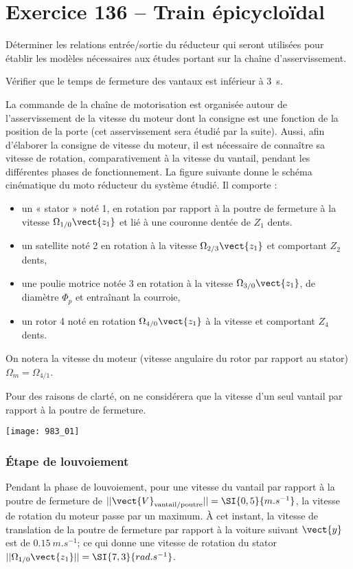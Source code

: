 \section*{Exercice 136 -- Train épicycloïdal}
\setcounter{exo}{0}


\begin{obj}
Déterminer les relations entrée/sortie du réducteur qui seront utilisées pour établir les modèles nécessaires aux études portant sur la chaîne d’asservissement.

Vérifier que le temps de fermeture des vantaux est inférieur à \SI{3}{s}.
\end{obj}

La commande de la chaîne de motorisation est organisée autour de l’asservissement
de la vitesse du moteur dont la consigne est une fonction de la position de
la porte (cet asservissement sera étudié par la suite). Aussi, afin d’élaborer la
consigne de vitesse du moteur, il est nécessaire de connaître sa vitesse de rotation,
comparativement à la vitesse du vantail, pendant les différentes phases de
fonctionnement.
La figure suivante donne le schéma cinématique du moto réducteur du système étudié.
Il comporte :
\begin{itemize}
\item un « stator » noté 1, en rotation par rapport à la poutre de fermeture à la
vitesse $\Omega_{1/0}\vect{z_1}$ et lié à une couronne dentée de $Z_1$ dents.
\item un satellite noté 2 en rotation à la vitesse $\Omega_{2/3}\vect{z_1}$ et comportant $Z_2$ dents,
\item une poulie motrice notée 3 en rotation à la vitesse $\Omega_{3/0}\vect{z_1}$, de diamètre $\Phi_p$ et
entraînant la courroie,
\item un rotor 4 noté en rotation $\Omega_{4/0}\vect{z_1}$ à la vitesse et comportant $Z_4$ dents.
\end{itemize}

On notera la vitesse du moteur (vitesse angulaire du rotor par rapport au stator) $\Omega_{m}=\Omega_{4/1}$.

Pour des raisons de clarté, on ne considérera que la vitesse d’un seul vantail par
rapport à la poutre de fermeture.


\begin{center}
\texttt{[image: 983\_01]}%
\end{center}


\subsubsection*{Étape de louvoiement}
Pendant la phase de louvoiement, pour une vitesse du vantail par rapport à la
poutre de fermeture de $||\vect{V}_{\text{vantail}/\text{poutre}} || = \SI{0,5}{m.s^{-1}}$, la vitesse de rotation du
moteur passe par un maximum. À cet instant, la vitesse de translation de la
poutre de fermeture par rapport à la voiture suivant $\vect{y}$ est de $\SI{0,15}{m.s^{-1}}$; ce qui
donne une vitesse de rotation du stator $||\Omega_{1/0}\vect{z_1}||=\SI{7,3}{rad.s^{-1}}$.

